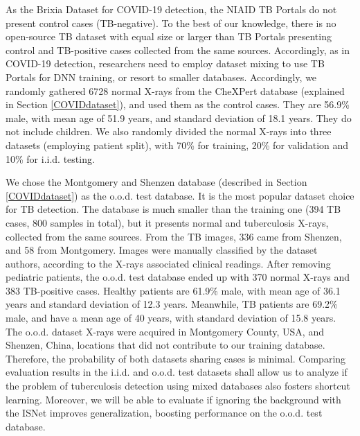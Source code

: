 \documentclass[fleqn,10pt]{wlscirep}
\begin{document}
{As the Brixia Dataset for COVID-19 detection, the NIAID TB Portals do not present control cases (TB-negative). To the best of our knowledge, there is no open-source TB dataset with equal size or larger than TB Portals presenting control and TB-positive cases collected from the same sources. Accordingly, as in COVID-19 detection, researchers need to employ dataset mixing to use TB Portals for DNN training, or resort to smaller databases. Accordingly, we randomly gathered 6728 normal X-rays from the CheXPert database (explained in Section \ref{COVIDdataset}), and used them as the control cases. They are 56.9\% male, with mean age of 51.9 years, and standard deviation of 18.1 years. They do not include children. We also randomly divided the normal X-rays into three datasets (employing patient split), with 70\% for training, 20\% for validation and 10\% for i.i.d. testing.

We chose the Montgomery and Shenzen database\cite{ChineseDataset1} (described in Section \ref{COVIDdataset}) as the o.o.d. test database. It is the most popular dataset choice for TB detection\cite{TBReview}. The database is much smaller than the training one (394 TB cases, 800 samples in total), but it presents normal and tuberculosis X-rays, collected from the same sources. From the TB images, 336 came from Shenzen, and 58 from Montgomery. Images were manually classified by the dataset authors, according to the X-rays associated clinical readings\cite{ChineseDataset1}. After removing pediatric patients, the o.o.d. test database ended up with 370 normal X-rays and 383 TB-positive cases. Healthy patients are 61.9\% male, with mean age of 36.1 years and standard deviation of 12.3 years. Meanwhile, TB patients are 69.2\% male, and have a mean age of 40 years, with standard deviation of 15.8 years. The o.o.d. dataset X-rays were acquired in Montgomery County, USA, and Shenzen, China, locations that did not contribute to our training database. Therefore, the probability of both datasets sharing cases is minimal. Comparing evaluation results in the i.i.d. and o.o.d. test datasets shall allow us to analyze if the problem of tuberculosis detection using mixed databases also fosters shortcut learning. Moreover, we will be able to evaluate if ignoring the background with the ISNet improves generalization, boosting performance on the o.o.d. test database.

}
\end{document}
